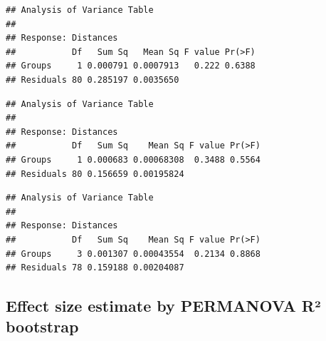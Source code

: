 \documentclass[]{article}
\newenvironment{Shaded}{\begin{snugshade}}{\end{snugshade}}
\newcommand{\KeywordTok}[1]{\textcolor[rgb]{0.13,0.29,0.53}{\textbf{#1}}}
\newcommand{\OperatorTok}[1]{\textcolor[rgb]{0.81,0.36,0.00}{\textbf{#1}}}
\newcommand{\NormalTok}[1]{#1}
\begin{document}
\begin{verbatim}
## Analysis of Variance Table
## 
## Response: Distances
##           Df   Sum Sq   Mean Sq F value Pr(>F)
## Groups     1 0.000791 0.0007913   0.222 0.6388
## Residuals 80 0.285197 0.0035650
\end{verbatim}

\begin{Shaded}
\end{Shaded}

\begin{verbatim}
## Analysis of Variance Table
## 
## Response: Distances
##           Df   Sum Sq    Mean Sq F value Pr(>F)
## Groups     1 0.000683 0.00068308  0.3488 0.5564
## Residuals 80 0.156659 0.00195824
\end{verbatim}

\begin{Shaded}
\end{Shaded}

\begin{verbatim}
## Analysis of Variance Table
## 
## Response: Distances
##           Df   Sum Sq    Mean Sq F value Pr(>F)
## Groups     3 0.001307 0.00043554  0.2134 0.8868
## Residuals 78 0.159188 0.00204087
\end{verbatim}

\subsection{Effect size estimate by PERMANOVA R²
bootstrap}\label{effect-size-estimate-by-permanova-r-bootstrap}
\end{document}
